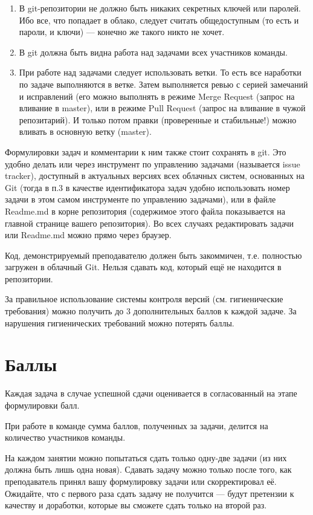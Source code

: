 \documentclass[a4paper,12pt]{article}
\begin{document}
\begin{enumerate}
    \item В git-репозитории не должно быть никаких секретных ключей или паролей. Ибо все, что попадает в облако, следует считать общедоступным (то есть и пароли, и ключи) — конечно же такого никто не хочет.
    \item В git должна быть видна работа над задачами всех участников команды.
    \item При работе над задачами следует использовать ветки. То есть все наработки по задаче выполняются в ветке. Затем выполняется ревью с серией замечаний и исправлений (его можно выполнять в режиме Merge Request (запрос на вливание в master), или в режиме Pull Request (запрос на вливание в чужой репозитарий). И только потом правки (проверенные и стабильные!) можно вливать в основную ветку (master).
\end{enumerate}

Формулировки задач и комментарии к ним также стоит сохранять в git. Это удобно делать или через инструмент по управлению задачами (называется issue tracker), доступный в актуальных версиях всех облачных систем, основанных на Git (тогда в п.3 в качестве идентификатора задач удобно использовать номер задачи в этом самом инструменте по управлению задачами), или в файле Readme.md в корне репозитория (содержимое этого файла показывается на главной странице вашего репозитория). Во всех случаях редактировать задачи или Readme.md можно прямо через браузер.

Код, демонстрируемый преподавателю должен быть закоммичен, т.е. полностью загружен в облачный Git. Нельзя сдавать код, который ещё не находится в репозитории.

За правильное использование системы контроля версий (см. гигиенические требования) можно получить до 3 дополнительных баллов к каждой задаче. За нарушения гигиенических требований можно потерять баллы.

\section{Баллы}

Каждая задача в случае успешной сдачи оценивается в согласованный на этапе формулировки балл.

При работе в команде сумма баллов, полученных за задачи, делится на количество участников команды.

На каждом занятии можно попытаться сдать только одну-две задачи (из них должна быть лишь одна новая). Сдавать задачу можно только после того, как преподаватель принял вашу формулировку задачи или скорректировал её. Ожидайте, что с первого раза сдать задачу не получится — будут претензии к качеству и доработки, которые вы сможете сдать только на второй раз.
\end{document}

